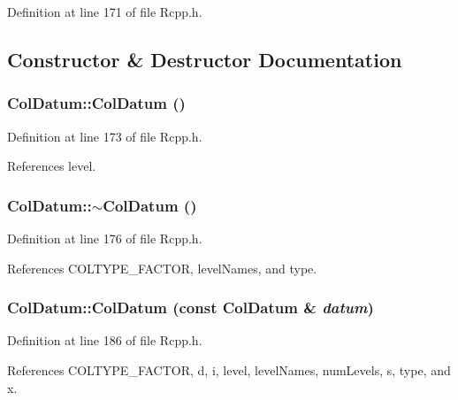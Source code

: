 Definition at line 171 of file Rcpp.h.

\subsection{Constructor \& Destructor Documentation}
\hypertarget{classColDatum_b0aa09b7e8d9acd2b0435b256c6b4da7}{
\subsubsection[{ColDatum}]{\setlength{\rightskip}{0pt plus 5cm}ColDatum::ColDatum ()}}
\label{classColDatum_b0aa09b7e8d9acd2b0435b256c6b4da7}




Definition at line 173 of file Rcpp.h.

References level.\hypertarget{classColDatum_ccc1e3ec9da32643bd4953f983165b64}{
\subsubsection[{$\sim$ColDatum}]{\setlength{\rightskip}{0pt plus 5cm}ColDatum::$\sim$ColDatum ()}}
\label{classColDatum_ccc1e3ec9da32643bd4953f983165b64}




Definition at line 176 of file Rcpp.h.

References COLTYPE\_\-FACTOR, levelNames, and type.\hypertarget{classColDatum_0507c6e2b4c76ee5364af001855fbe4e}{
\subsubsection[{ColDatum}]{\setlength{\rightskip}{0pt plus 5cm}ColDatum::ColDatum (const {\bf ColDatum} \& {\em datum})}}
\label{classColDatum_0507c6e2b4c76ee5364af001855fbe4e}




Definition at line 186 of file Rcpp.h.

References COLTYPE\_\-FACTOR, d, i, level, levelNames, numLevels, s, type, and x.

